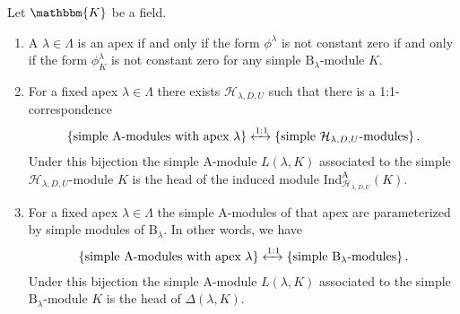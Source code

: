 \documentclass[a4paper,11pt]{amsart}
\newcommand{\setstuff}[1]{\mathrm{#1}}
\newcommand{\KK}{\mathbbm{K}}
\numberwithin{equation}{section}
\begin{document}
\begin{theorem}\label{theorem:classification}
Let $\KK$ be a field.
\begin{enumerate}

\item A $\lambda\in\Lambda$ is an apex if and 
only if the form $\phi^{\lambda}$ is not constant zero 
if and only if the form $\phi^{\lambda}_{K}$ is not constant zero 
for any simple $\setstuff{B}_{\lambda}$-module $K$.

\item For a fixed apex $\lambda\in\Lambda$ there exists 
$\mathcal{H}_{\lambda,D,U}$ such that there is a 1:1-correspondence
\begin{gather*}
\left\{
\text{simple $\setstuff{A}$-modules with apex $\lambda$}
\right\}
\xleftrightarrow{1:1}
\left\{
\text{simple $\mathcal{H}_{\lambda,D,U}$-modules}
\right\}
.
\end{gather*}	
Under this bijection the 
simple $\setstuff{A}$-module $L(\lambda,K)$ 
associated to the simple $\mathcal{H}_{\lambda,D,U}$-module $K$
is the head of the induced module 
$\mathrm{Ind}_{\mathcal{H}_{\lambda,D,U}}^{\setstuff{A}}(K)$.

\item For a fixed apex $\lambda\in\Lambda$
the simple $\setstuff{A}$-modules of that apex are 
parameterized by simple 
modules of $\setstuff{B}_{\lambda}$. In other words, we have
\begin{gather*}
\left\{
\text{simple $\setstuff{A}$-modules with apex $\lambda$}
\right\}
\xleftrightarrow{1:1}
\left\{
\text{simple $\setstuff{B}_{\lambda}$-modules}
\right\}
.
\end{gather*}
Under this bijection the 
simple $\setstuff{A}$-module $L(\lambda,K)$ 
associated to the simple $\setstuff{B}_{\lambda}$-module $K$
is the head of
$\Delta(\lambda,K)$.

\end{enumerate}
\end{theorem}
\end{document}
